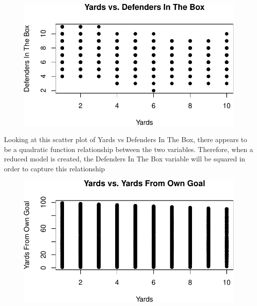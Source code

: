 \documentclass[
  super,
  preprint,
  3p]{elsarticle}
\newenvironment{Shaded}{\begin{snugshade}}{\end{snugshade}}
\newcommand{\AttributeTok}[1]{\textcolor[rgb]{0.40,0.45,0.13}{#1}}
\newcommand{\CommentTok}[1]{\textcolor[rgb]{0.37,0.37,0.37}{#1}}
\newcommand{\DecValTok}[1]{\textcolor[rgb]{0.68,0.00,0.00}{#1}}
\newcommand{\FunctionTok}[1]{\textcolor[rgb]{0.28,0.35,0.67}{#1}}
\newcommand{\NormalTok}[1]{\textcolor[rgb]{0.00,0.23,0.31}{#1}}
\newcommand{\SpecialCharTok}[1]{\textcolor[rgb]{0.37,0.37,0.37}{#1}}
\newcommand{\StringTok}[1]{\textcolor[rgb]{0.13,0.47,0.30}{#1}}
\begin{document}
\begin{figure}[H]

{\centering \includegraphics{project_report_files/figure-pdf/unnamed-chunk-11-1.pdf}

}

\end{figure}

Looking at this scatter plot of Yards vs Defenders In The Box, there
appears to be a quadratic function relationship between the two
variables. Therefore, when a reduced model is created, the Defenders In
The Box variable will be squared in order to capture this relationship

\begin{Shaded}
\end{Shaded}

\begin{figure}[H]

{\centering \includegraphics{project_report_files/figure-pdf/unnamed-chunk-12-1.pdf}

}

\end{figure}
\end{document}

